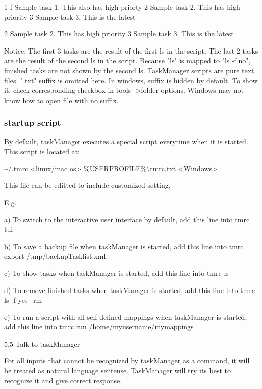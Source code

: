 \documentclass[12pt, a4paper]{article}
\begin{document}
    1 f Sample task 1. This also has high priorty
    2   Sample task 2. This has high priority
    3   Sample task 3. This is the latest


    2   Sample task 2. This has high priority
    3   Sample task 3. This is the latest

Notice: The first 3 tasks are the result of the first ls in the script.
        The last 2 tasks are the result of the second ls in the script.
        Because "ls" is mapped to "ls -f no", finished tasks are not shown by the second ls.
        TaskManager scripts are pure text files. ".txt" suffix is omitted here.
        In windows, suffix is hidden by default. To show it, check corresponding checkbox in tools -\textgreater folder options. 
        Windows may not know how to open file with no suffix.

\subsubsection{startup script}

By default, taskManager executes a special script everytime when it is started. 
This script is located at:

    \~{}/.tmrc                 \textless linux/mac os\textgreater
    \%USERPROFILE\%\textbackslash tmrc.txt  \textless Windows\textgreater

This file can be editted to include customized setting.

E.g.

    a) To switch to the interactive user interface by default, add this line into tmrc
    tui

    b) To save a backup file when taskManager is started, add this line into tmrc
    export /tmp/backupTasklist.xml

    c) To show tasks when taskManager is started, add this line into tmrc
    ls

    d) To remove finished tasks when taskManager is started, add this line into tmrc
    ls -f yes \textbar \  rm

    e) To run a script with all self-defined mappings when taskManager is started, add this line into tmrc
    run /home/myusername/mymappings

5.5 Talk to taskManager

For all inputs that cannot be recognized by taskManager as a command, it will be treated as natural language sentense. 
TaskManager will try its best to recognize it and give correct response.
\end{document}
